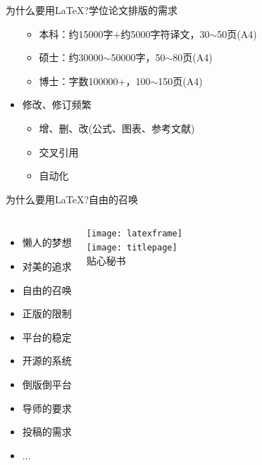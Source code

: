 \documentclass[xcolor=svgnames, t, aspectratio=169]{ctexbeamer}
\begin{document}
\begin{frame}{为什么要用\LaTeX?}{学位论文排版的需求}
\begin{spacing}{0.85}
\begin{itemize}
\begin{itemize}
    \item 本科：约15000字+约5000字符译文，30$\sim$50页(A4)
    \item 硕士：约30000$\sim$50000字，50$\sim$80页(A4)
    \item 博士：字数100000+，100$\sim$150页(A4)
    \end{itemize}  
  \item 修改、修订\alert{频繁}
    \begin{itemize}
    \item 增、删、改(公式、图表、参考文献)
    \item 交叉引用
    \item \alert{自动化}
    \end{itemize}  
  \end{itemize}
  \end{spacing}
\end{frame}

\begin{frame}{为什么要用\LaTeX?}{自由的召唤}
  \begin{columns}[c]
    \begin{itemize} \setlength\itemsep{1em}
    \item \alert{懒人}的梦想
    \item 对\alert{美}的追求
    \item \alert{自由}的召唤
    \item \alert{正版}的限制
    \item 平台的\alert{稳定}
    \item \alert{开源}的系统
    \item \alert{倒版倒平台}
    \item \alert{导师}的要求
    \item \alert{投稿}的需求
    \item $\ldots$\hphantom{倒版倒a}%
    \end{itemize}
    \begin{center}
      \texttt{[image: latexframe]}\\
      \texttt{[image: titlepage]}\\%
      贴心\alert{秘书}
    \end{center}
  \end{columns}
\end{frame}
\end{document}
